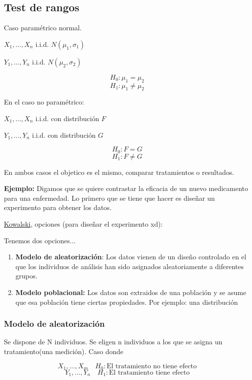 \subsection{Test de rangos}

Caso paramétrico normal.

$X_1,\dots,X_n$ i.i.d. $N(\mu_1,\sigma_1)$

$Y_1,\dots,Y_n$ i.i.d. $N(\mu_2,\sigma_2)$

\[
    H_0:\mu_1=\mu_2
\]
\[
    H_1: \mu_1 \neq \mu_2
\]

En el caso no paramétrico:

$X_1,\dots,X_n$ i.i.d. con distribución $F$

$Y_1,\dots,Y_n$ i.i.d. con distribución $G$

\[
    H_0:F=G
\]
\[
    H_1: F \neq G
\]

En ambos casos el objetico es el mismo, comparar tratamientos o resultados.

\textbf{Ejemplo:} 
Digamos que se quiere contrastar la eficacia de un nuevo medicamento para una enfermedad.
Lo primero que se tiene que hacer es diseñar un experimento para obtener los datos.

\begin{center}
    \href{https://media.tenor.com/lsbTX_Avt2AAAAAM/brushing-teeth-kowalski.gif}{Kowalski}, opciones (para diseñar el experimento xd):
\end{center}

\noindent Tenemos dos opciones...
\begin{enumerate}
    \item \textbf{Modelo de aleatorización}: Los datos vienen de un diseño controlado en el que los 
    individuos de análisis han sido asignados aleatoriamente a diferentes grupos.
    \item \textbf{Modelo poblacional:} Los datos son extraidos de una población y se asume que esa población tiene ciertas propiedades. 
    Por ejemplo: una distribución
\end{enumerate}

\subsubsection{Modelo de aleatorización}

Se dispone de N individuos. Se eligen n individuos a los que se asigna un tratamiento(una medición).
Caso donde

\[
    X_1,\dots,X_m \quad H_0: \text{El tratamiento no tiene efecto} 
\]
\[
    Y_1,\dots,Y_n \quad H_1: \text{El tratamiento tiene efecto} 
\]

